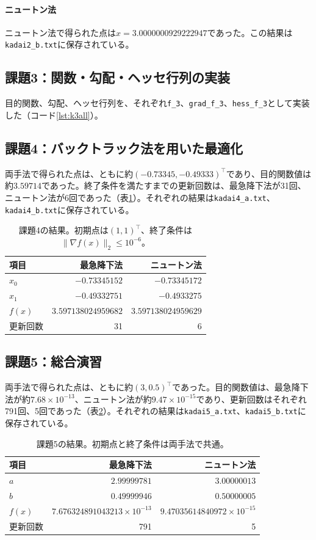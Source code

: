 \documentclass[a4j]{jarticle}
\begin{document}
\paragraph{ニュートン法}
ニュートン法で得られた点は$x=3.0000000929222947$であった。この結果は\texttt{kadai2\_b.txt}に保存されている。

\subsection{課題3：関数・勾配・ヘッセ行列の実装}
目的関数、勾配、ヘッセ行列を、それぞれ\texttt{f\_3}、\texttt{grad\_f\_3}、\texttt{hess\_f\_3}として実装した（コード\ref{lst:k3all}）。

\subsection{課題4：バックトラック法を用いた最適化}
両手法で得られた点は、ともに約$(-0.73345,-0.49333)^\top$であり、目的関数値は約$3.59714$であった。終了条件を満たすまでの更新回数は、最急降下法が31回、ニュートン法が6回であった（表\ref{tab:problem4}）。それぞれの結果は\texttt{kadai4\_a.txt}、\texttt{kadai4\_b.txt}に保存されている。
\begin{table}[htbp]
  \centering
  \caption{課題4の結果。初期点は$(1,1)^\top$、終了条件は$\|\nabla f(x)\|_2\le10^{-6}$。}
  \label{tab:problem4}
  \small
  \begin{tabular}{lrr}\hline
    項目 & 最急降下法 & ニュートン法\\\hline
    $x_0$ & $-0.73345152$ & $-0.73345172$\\
    $x_1$ & $-0.49332751$ & $-0.4933275$\\
    $f(x)$ & $3.597138024959682$ & $3.597138024959629$\\
    更新回数 & 31 & 6\\\hline
  \end{tabular}
\end{table}

\subsection{課題5：総合演習}
両手法で得られた点は、ともに約$(3,0.5)^\top$であった。目的関数値は、最急降下法が約$7.68\times10^{-13}$、ニュートン法が約$9.47\times10^{-15}$であり、更新回数はそれぞれ791回、5回であった（表\ref{tab:problem5}）。それぞれの結果は\texttt{kadai5\_a.txt}、\texttt{kadai5\_b.txt}に保存されている。
\begin{table}[htbp]
  \centering
  \caption{課題5の結果。初期点と終了条件は両手法で共通。}
  \label{tab:problem5}
  \small
  \begin{tabular}{lrr}\hline
    項目 & 最急降下法 & ニュートン法\\\hline
    $a$ & $2.99999781$ & $3.00000013$\\
    $b$ & $0.49999946$ & $0.50000005$\\
    $f(x)$ & $7.676324891043213\times10^{-13}$ & $9.47035614840972\times10^{-15}$\\
    更新回数 & 791 & 5\\\hline
  \end{tabular}
\end{table}
\end{document}
